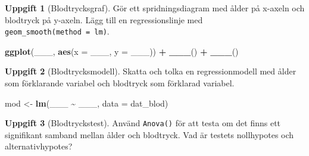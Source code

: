 \documentclass[
]{book}
\newenvironment{Shaded}{\begin{snugshade}}{\end{snugshade}}
\newcommand{\AttributeTok}[1]{\textcolor[rgb]{0.13,0.29,0.53}{#1}}
\newcommand{\FunctionTok}[1]{\textcolor[rgb]{0.13,0.29,0.53}{\textbf{#1}}}
\newcommand{\NormalTok}[1]{#1}
\newcommand{\OtherTok}[1]{\textcolor[rgb]{0.56,0.35,0.01}{#1}}
\newcommand{\SpecialCharTok}[1]{\textcolor[rgb]{0.81,0.36,0.00}{\textbf{#1}}}
\theoremstyle{definition}
\theoremstyle{definition}
\theoremstyle{definition}
\newtheorem{exercise}{Uppgift}[chapter]
\theoremstyle{definition}
\theoremstyle{remark}
\begin{document}
\begin{exercise}[Blodtrycksgraf]

Gör ett spridningsdiagram med ålder på x-axeln och blodtryck på y-axeln. Lägg till en regressionslinje med \texttt{geom\_smooth(method\ =\ lm)}.

\begin{Shaded}
\begin{Highlighting}[]
\FunctionTok{ggplot}\NormalTok{(\_\_\_, }\FunctionTok{aes}\NormalTok{(}\AttributeTok{x =}\NormalTok{ \_\_\_, }\AttributeTok{y =}\NormalTok{ \_\_\_)) }\SpecialCharTok{+}
  \FunctionTok{\_\_\_}\NormalTok{() }\SpecialCharTok{+}
  \FunctionTok{\_\_\_}\NormalTok{()}
\end{Highlighting}
\end{Shaded}

\end{exercise}

\begin{exercise}[Blodtrycksmodell]

Skatta och tolka en regressionmodell med ålder som förklarande variabel och blodtryck som förklarad variabel.

\begin{Shaded}
\begin{Highlighting}[]
\NormalTok{mod }\OtherTok{\textless{}{-}} \FunctionTok{lm}\NormalTok{(\_\_\_ }\SpecialCharTok{\textasciitilde{}}\NormalTok{ \_\_\_, }\AttributeTok{data =}\NormalTok{ dat\_blod)}
\end{Highlighting}
\end{Shaded}

\end{exercise}

\begin{exercise}[Blodtryckstest]
Använd \texttt{Anova()} för att testa om det finns ett signifikant samband mellan ålder och blodtryck. Vad är testets nollhypotes och alternativhypotes?
\end{exercise}
\end{document}
